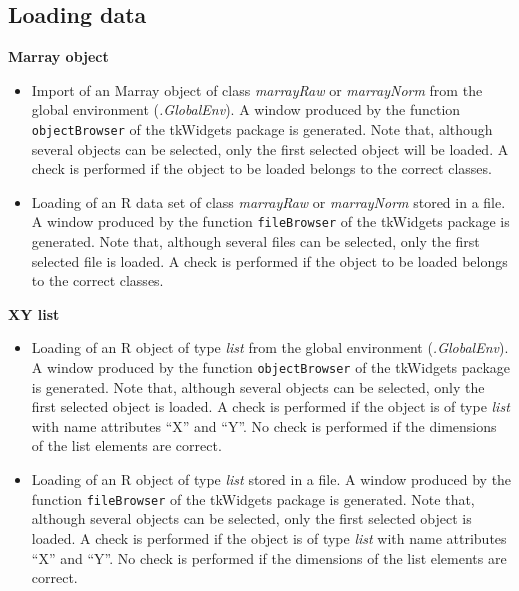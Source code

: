 \documentclass[a4paper,11pt]{article}
\begin{document}
\subsection{Loading data}

\textbf{Marray object}
\begin{itemize}
\item {} Import of an Marray object of class \textit{marrayRaw}
 or \textit{marrayNorm} from the global environment (\textit{.GlobalEnv}). 
A window produced by the function \texttt{objectBrowser} of the 
tkWidgets package is generated. Note that, although
several objects can be selected, only the first selected object will be loaded. 
A check is performed if the object to be loaded belongs to the correct classes. 

\item {} Loading of an R data set   of class \textit{marrayRaw}
 or \textit{marrayNorm} stored in a file. 
A window produced by the function \texttt{fileBrowser} of the 
tkWidgets package is generated. Note that, although
several files can be selected, only the first selected file is loaded. A check is performed if the object to be loaded belongs to the correct classes. 
\end{itemize}

\noindent \textbf{XY  list}
\begin{itemize}
\item {} Loading of an R object of type \textit{list} from the global environment (\textit{.GlobalEnv}). 
A window produced by the function \texttt{objectBrowser} of the 
tkWidgets package is generated. Note that, although
several objects can be selected, only the first selected object is loaded. A check is performed if the object is of type \textit{list} with name attributes ``X'' and ``Y''. No
check is performed if the dimensions of the list elements are correct.


\item {} Loading of an R object of type \textit{list} stored in a file. 
A window produced by the function \texttt{fileBrowser} of the 
tkWidgets package is generated. Note that, although
several objects can be selected, only the first selected object is loaded. A check is performed if the object is of type \textit{list} with name attributes ``X'' and ``Y''. No
check is performed if the dimensions of the list elements are correct.

\end{itemize}
\end{document}
